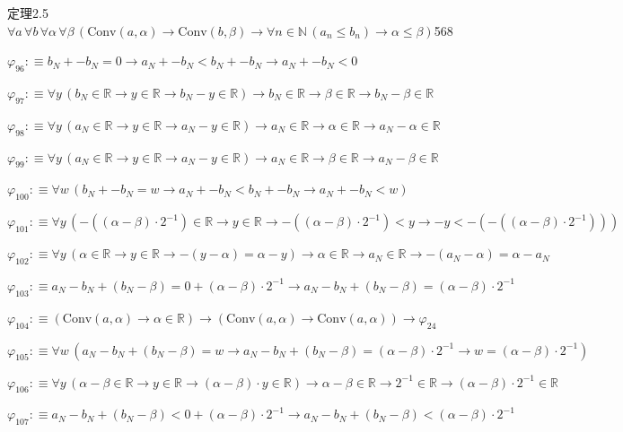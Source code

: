 \begin{fullproof}{定理2.5}{$\forall a\,\forall b\,\forall \alpha\,\forall \beta\,(\mathrm{Conv}(a,\alpha) \to \mathrm{Conv}(b,\beta) \to \forall n \in \mathbb{N}\,(a_{n} \leq b_{n}) \to \alpha \leq \beta)$}{568}
\begin{abbrevlist}
\item $\varphi_{96} :\equiv b_{N} + -b_{N} = 0 \to a_{N} + -b_{N} < b_{N} + -b_{N} \to a_{N} + -b_{N} < 0$
\item $\varphi_{97} :\equiv \forall y\,(b_{N} \in \mathbb{R} \to y \in \mathbb{R} \to b_{N} - y \in \mathbb{R}) \to b_{N} \in \mathbb{R} \to \beta \in \mathbb{R} \to b_{N} - \beta \in \mathbb{R}$
\item $\varphi_{98} :\equiv \forall y\,(a_{N} \in \mathbb{R} \to y \in \mathbb{R} \to a_{N} - y \in \mathbb{R}) \to a_{N} \in \mathbb{R} \to \alpha \in \mathbb{R} \to a_{N} - \alpha \in \mathbb{R}$
\item $\varphi_{99} :\equiv \forall y\,(a_{N} \in \mathbb{R} \to y \in \mathbb{R} \to a_{N} - y \in \mathbb{R}) \to a_{N} \in \mathbb{R} \to \beta \in \mathbb{R} \to a_{N} - \beta \in \mathbb{R}$
\item $\varphi_{100} :\equiv \forall w\,(b_{N} + -b_{N} = w \to a_{N} + -b_{N} < b_{N} + -b_{N} \to a_{N} + -b_{N} < w)$
\item $\varphi_{101} :\equiv \forall y\,(-((\alpha - \beta) \cdot 2^{-1}) \in \mathbb{R} \to y \in \mathbb{R} \to -((\alpha - \beta) \cdot 2^{-1}) < y \to -y < -(-((\alpha - \beta) \cdot 2^{-1})))$
\item $\varphi_{102} :\equiv \forall y\,(\alpha \in \mathbb{R} \to y \in \mathbb{R} \to -(y - \alpha) = \alpha - y) \to \alpha \in \mathbb{R} \to a_{N} \in \mathbb{R} \to -(a_{N} - \alpha) = \alpha - a_{N}$
\item $\varphi_{103} :\equiv a_{N} - b_{N} + (b_{N} - \beta) = 0 + (\alpha - \beta) \cdot 2^{-1} \to a_{N} - b_{N} + (b_{N} - \beta) = (\alpha - \beta) \cdot 2^{-1}$
\item $\varphi_{104} :\equiv (\mathrm{Conv}(a,\alpha) \to \alpha \in \mathbb{R}) \to (\mathrm{Conv}(a,\alpha) \to \mathrm{Conv}(a,\alpha)) \to \varphi_{24}$
\item $\varphi_{105} :\equiv \forall w\,(a_{N} - b_{N} + (b_{N} - \beta) = w \to a_{N} - b_{N} + (b_{N} - \beta) = (\alpha - \beta) \cdot 2^{-1} \to w = (\alpha - \beta) \cdot 2^{-1})$
\item $\varphi_{106} :\equiv \forall y\,(\alpha - \beta \in \mathbb{R} \to y \in \mathbb{R} \to (\alpha - \beta) \cdot y \in \mathbb{R}) \to \alpha - \beta \in \mathbb{R} \to 2^{-1} \in \mathbb{R} \to (\alpha - \beta) \cdot 2^{-1} \in \mathbb{R}$
\item $\varphi_{107} :\equiv a_{N} - b_{N} + (b_{N} - \beta) < 0 + (\alpha - \beta) \cdot 2^{-1} \to a_{N} - b_{N} + (b_{N} - \beta) < (\alpha - \beta) \cdot 2^{-1}$

\end{abbrevlist}
\end{fullproof}
